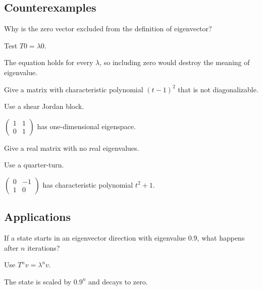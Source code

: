 \subsection*{Counterexamples}

\begin{exercise}\label{exr:i09-expand-10}
Why is the zero vector excluded from the definition of eigenvector?
\end{exercise}
\begin{hint}
Test \(T0=\lambda0\).
\end{hint}
\begin{solution}
The equation holds for every \(\lambda\), so including zero would destroy the meaning of eigenvalue.
\end{solution}

\begin{exercise}\label{exr:i09-expand-11}
Give a matrix with characteristic polynomial \((t-1)^2\) that is not diagonalizable.
\end{exercise}
\begin{hint}
Use a shear Jordan block.
\end{hint}
\begin{solution}
\(\begin{pmatrix}1&1\\0&1\end{pmatrix}\) has one-dimensional eigenspace.
\end{solution}

\begin{exercise}\label{exr:i09-expand-12}
Give a real matrix with no real eigenvalues.
\end{exercise}
\begin{hint}
Use a quarter-turn.
\end{hint}
\begin{solution}
\(\begin{pmatrix}0&-1\\1&0\end{pmatrix}\) has characteristic polynomial \(t^2+1\).
\end{solution}

\subsection*{Applications}

\begin{exercise}\label{exr:i09-expand-13}
If a state starts in an eigenvector direction with eigenvalue \(0.9\), what happens after \(n\) iterations?
\end{exercise}
\begin{hint}
Use \(T^nv=\lambda^nv\).
\end{hint}
\begin{solution}
The state is scaled by \(0.9^n\) and decays to zero.
\end{solution}

